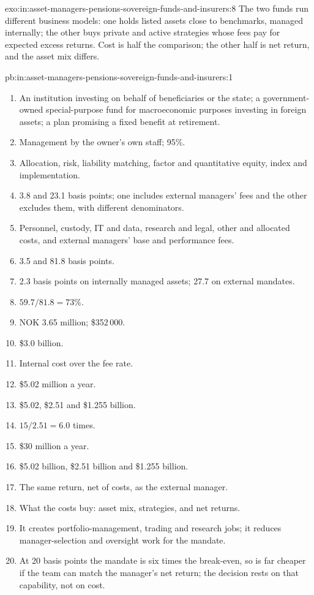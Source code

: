 \begin{solution}{exo:in:asset-managers-pensions-sovereign-funds-and-insurers:8}
The two funds run different business models: one holds listed assets close to benchmarks, managed internally; the other
buys private and active strategies whose fees pay for expected excess returns. Cost is half the comparison; the other
half is net return, and the asset mix differs.
\end{solution}

\begin{solution}{pb:in:asset-managers-pensions-sovereign-funds-and-insurers:1}
\begin{enumerate}
\item An institution investing on behalf of beneficiaries or the state; a government-owned special-purpose fund for
macroeconomic purposes investing in foreign assets; a plan promising a fixed benefit at retirement.
\item Management by the owner's own staff; 95\%.
\item Allocation, risk, liability matching, factor and quantitative equity, index and implementation.
\item 3.8 and 23.1 basis points; one includes external managers' fees and the other excludes them, with different
denominators.
\item Personnel, custody, IT and data, research and legal, other and allocated costs, and external managers' base and
performance fees.
\item 3.5 and 81.8 basis points.
\item 2.3 basis points on internally managed assets; 27.7 on external mandates.
\item $59.7/81.8=73\%$.
\item NOK 3.65 million; \$352\,000.
\item \$3.0 billion.
\item Internal cost over the fee rate.
\item \$5.02 million a year.
\item \$5.02, \$2.51 and \$1.255 billion.
\item $15/2.51=6.0$ times.
\item \$30 million a year.
\item \$5.02 billion, \$2.51 billion and \$1.255 billion.
\item The same return, net of costs, as the external manager.
\item What the costs buy: asset mix, strategies, and net returns.
\item It creates portfolio-management, trading and research jobs; it reduces manager-selection and oversight work for the
mandate.
\item At 20 basis points the mandate is six times the break-even, so  is far cheaper if the team can
match the manager's net return; the decision rests on that capability, not on cost.
\end{enumerate}
\end{solution}

